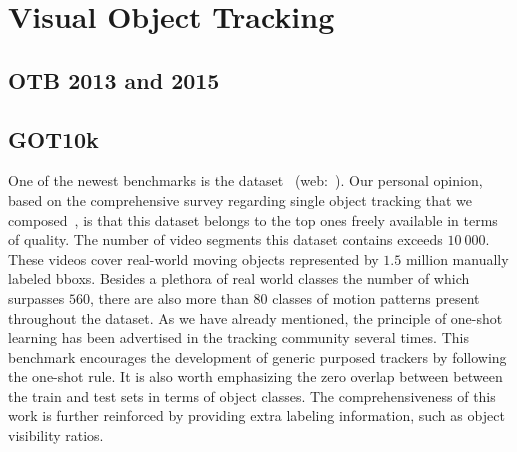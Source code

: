 \section{Visual Object Tracking}

\subsection{OTB 2013 and 2015}
\label{ssec:DatasetOTB1315}


\subsection{GOT10k}
\label{ssec:DatasetGOT10k}

One of the newest benchmarks is the  dataset~\cite{Huang2021} (web:~\cite{got10kdataset}). Our personal opinion, based on the comprehensive survey regarding single object tracking that we composed~\cite{Ondrasovic2021Siamese}, is that this dataset belongs to the top ones freely available in terms of quality. The number of video segments this dataset contains exceeds $10\ 000$. These videos cover real-world moving objects represented by $1.5$ million manually labeled \glspl{bbox}. Besides a plethora of real world classes the number of which surpasses $560$, there are also more than $80$ classes of motion patterns present throughout the dataset.
As we have already mentioned, the principle of one-shot learning has been advertised in the tracking community several times. This benchmark encourages the development of generic purposed trackers by following the one-shot rule. It is also worth emphasizing the zero overlap between between the train and test sets in terms of object classes. The comprehensiveness of this work is further reinforced by providing extra labeling information, such as object visibility ratios.

